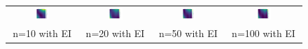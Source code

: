 \documentclass[11pt]{article}
\begin{document}
\begin{figure}[H]
    \centering
    \begin{tabular}{cccc}
        \includegraphics[width=0.225\textwidth]{../Task-02/plots/gp_mean_rational_quadratic_n10_EI.png} &
        \includegraphics[width=0.225\textwidth]{../Task-02/plots/gp_mean_rational_quadratic_n20_EI.png} &
        \includegraphics[width=0.225\textwidth]{../Task-02/plots/gp_mean_rational_quadratic_n50_EI.png} &
        \includegraphics[width=0.225\textwidth]{../Task-02/plots/gp_mean_rational_quadratic_n100_EI.png} \\
        n=10 with EI & n=20 with EI & n=50 with EI & n=100 with EI \\[0.5em]
        

\end{tabular}
\end{figure}
\end{document}
